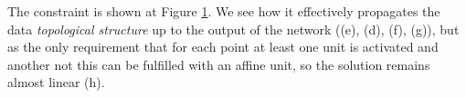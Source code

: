\begin{figure}
{{    %
    }
    \parbox{.195\textwidth}{%
    }
  }
  \caption{\SepPoint}
    \label{fig:moonsPointwise}
\end{figure}

The constraint \SepPoint is shown at Figure \ref{fig:moonsPointwise}. We see how it effectively propagates the data \emph{topological structure} up to the output of the network ((e), (d), (f), (g)), but as the only requirement that for each point at least one unit is activated and another not this can be fulfilled with an affine unit, so the solution remains almost linear (h). 

